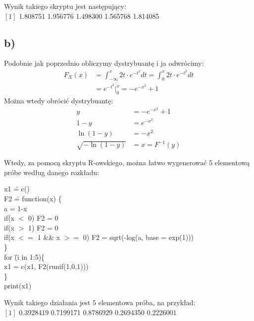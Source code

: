\documentclass{article}
\begin{document}
{Wynik takiego skryptu jest następujący: \\
$[1]$ 1.808751 1.956776 1.498300 1.565768 1.814085

\subsection{b)}
Podobnie jak poprzednio obliczymy dystrybuantę i ja odwrócimy:
\begin{align*}
F_X(x) & = \int_{-\infty}^{x} 2t \cdot e^{-t^2} dt =  \int_0^{x} 2t \cdot e^{-t^2} dt\\
& =  e^{-t^2} \Big\vert_{0}^x = -e^{-x^2} + 1
\end{align*}
Można wtedy obrócić dystrybuantę:
\begin{align*}
y & = -e^{-x^2} +1\\
1-y &= e^{-x^2} \\
\ln{(1-y)} &= -x^2 \\
\sqrt{-\ln{(1-y)}} &= x = F^{-1}(y)
\end{align*}

Wtedy, za pomocą skryptu R-owskiego, można łatwo wygenerować 5 elementową próbe według danego rozkładu:
{\selectfont
\begin{tabbing}
x1 \= = c() \\
F2 \= = function(x) \{ \+ \\
	a = 1-x \\
	if(x $<$ 0) { F2 = 0 } \\
	if(x $>$ 1) { F2 = 0 } \\
	if(x $<=$ 1 \&\& x $>=$ 0) {F2 = sqrt(-log(a, base = exp(1)))} \- \\
\} \\
for \= (i in 1:5)\{ \+ \\
	x1 = c(x1, F2(runif(1,0,1))) \- \\
\} \\
print(x1)
\end{tabbing}
}
Wynik takiego działania jest 5 elementowa próba, na przykład: \\
$[ 1 ]$ 0.3928419 0.7199171 0.8786929 0.2694350 0.2226001

\newpage
}
\end{document}
